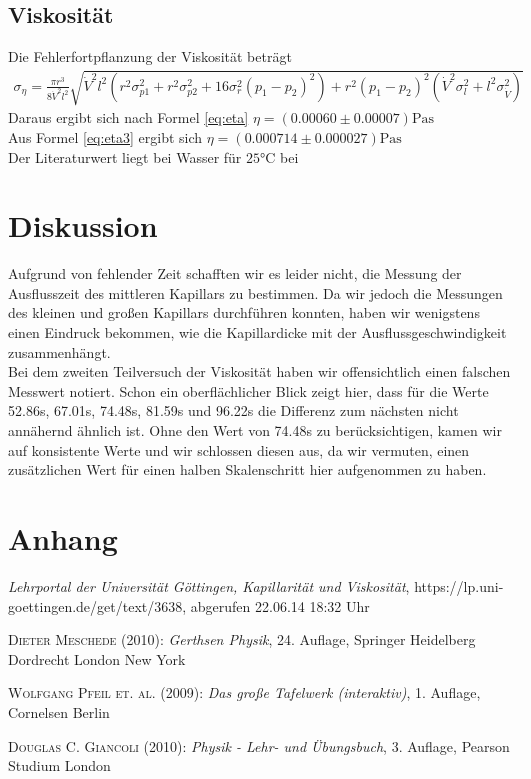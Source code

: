 \documentclass[12pt,a4paper,titlepage,headinclude,bibtotoc]{scrartcl}
\begin{document}
\subsection{Viskosität}
\begin{figure}
\centering

\end{figure}
Die Fehlerfortpflanzung der Viskosität beträgt
\begin{align*}
\sigma_{\eta}=\frac{\pi r^{3}}{8  \dot{V}^{2} l^{2}} \sqrt{\dot{V}^{2} l^{2} \left(r^{2}  \sigma_{p1}^{2} + r^{2} \sigma_{p2}^{2} + 16  \sigma_{r}^{2} \left(p_{1} - p_{2}\right)^{2}\right) + r^{2}\left(p_{1} - p_{2}\right)^{2}\left(\dot{V}^{2}  \sigma_{l}^{2}  + l^{2} \sigma_{\dot{V}}^{2}\right)}
\end{align*}
Daraus ergibt sich nach Formel \eqref{eq:eta} $\eta=(0.00060 \pm 0.00007)\si{\Pa\s}$\\
Aus Formel \eqref{eq:eta3} ergibt sich $\eta=(0.000714 \pm 0.000027)\si{\Pa\s} $\\
Der Literaturwert liegt bei Wasser für $25\si{\celsius}$ bei 

\section{Diskussion}
\label{sec:diskussion}
Aufgrund von fehlender Zeit schafften wir es leider nicht, die Messung der Ausflusszeit des mittleren Kapillars zu bestimmen.
Da wir jedoch die Messungen des kleinen und großen Kapillars durchführen konnten, haben wir wenigstens einen Eindruck bekommen, wie die Kapillardicke mit der Ausflussgeschwindigkeit zusammenhängt.\\
Bei dem zweiten Teilversuch der Viskosität haben wir offensichtlich einen falschen Messwert notiert.
Schon ein oberflächlicher Blick zeigt hier, dass für die Werte 52.86s, 67.01s, 74.48s, 81.59s und 96.22s die Differenz zum nächsten nicht annähernd ähnlich ist.
Ohne den Wert von 74.48s zu berücksichtigen, kamen wir auf konsistente Werte und wir schlossen diesen aus, da wir vermuten, einen zusätzlichen Wert für einen halben Skalenschritt hier aufgenommen zu haben.


\section{Anhang}
\begin{thebibliography}{9}

	\emph{Lehrportal der Universität Göttingen, Kapillarität und Viskosität},
  https://lp.uni-goettingen.de/get/text/3638, abgerufen 22.06.14 18:32 Uhr

	\textsc{Dieter Meschede} (2010): \emph{Gerthsen Physik}, 24. Auflage, Springer Heidelberg
Dordrecht London New York

	\textsc{Wolfgang Pfeil et. al.} (2009): \emph{Das große Tafelwerk (interaktiv)}, 1. Auflage, Cornelsen Berlin

	\textsc{Douglas C. Giancoli} (2010): \emph{Physik - Lehr- und Übungsbuch}, 3. Auflage, Pearson Studium London
\end{thebibliography}
\end{document}
